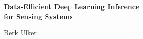 \begin{titlepage}
\centering
\vspace*{30mm}
{\LARGE\bfseries Data-Efficient Deep Learning Inference\\for Sensing Systems\par}
\vspace{20mm}
{\large Berk Ulker\par}
\vfill
\end{titlepage}
